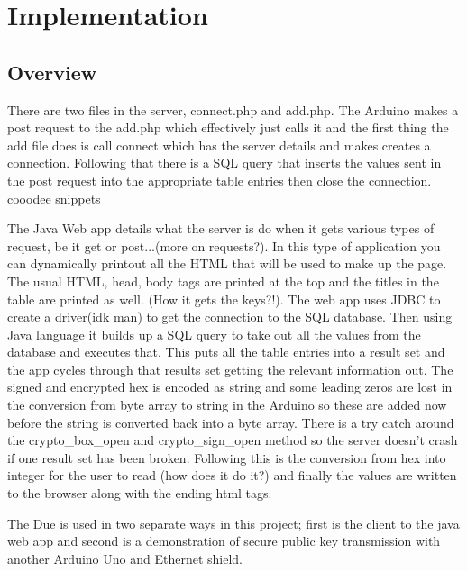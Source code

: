 
\chapter{Implementation}
\label{imple}

\section{Overview}

There are two files in the server, connect.php and add.php. The Arduino makes a post request to the add.php which effectively just calls it and the first thing the add file does is call connect which has the server details and makes creates a connection. Following that there is a SQL query that inserts the values sent in the post request into the appropriate table entries then close the connection. cooodee snippets

The Java Web app details what the server is do when it gets various types of request, be it get or post...(more on requests?). In this type of application you can dynamically printout all the HTML that will be used to make up the page. The usual  HTML, head, body tags are printed at the top and the titles in the table are printed as well. (How it gets the keys?!). The web app uses JDBC to create a driver(idk man) to get the connection to the SQL database. Then using Java language it builds up a SQL query to take out all the values from the database and executes that. This puts all the table entries into a result set and the app cycles through that results set getting the relevant information out. The signed and encrypted hex is encoded as string and some leading zeros are lost in the conversion from byte array to string in the Arduino so these are added now before the string is converted back into a byte array. There is a try catch around the crypto\_box\_open and crypto\_sign\_open method so the server doesn't crash if one result set has been broken. Following this is the conversion from hex into integer for the user to read (how does it do it?) and finally the values are written to the browser along with the ending html tags.


The Due is used in two separate ways in this project; first is the client to the java web app and second is a demonstration of secure public key transmission with another Arduino Uno and Ethernet shield. 

